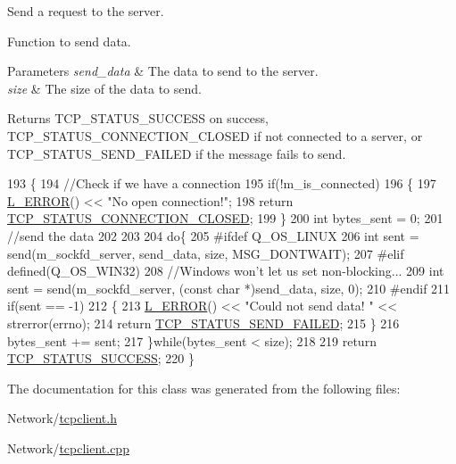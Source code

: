 Send a request to the server. 

Function to send data.


\begin{DoxyParams}{Parameters}
{\em send\-\_\-data} & The data to send to the server. \\
\hline
{\em size} & The size of the data to send. \\
\hline
\end{DoxyParams}
\begin{DoxyReturn}{Returns}
T\-C\-P\-\_\-\-S\-T\-A\-T\-U\-S\-\_\-\-S\-U\-C\-C\-E\-S\-S on success, T\-C\-P\-\_\-\-S\-T\-A\-T\-U\-S\-\_\-\-C\-O\-N\-N\-E\-C\-T\-I\-O\-N\-\_\-\-C\-L\-O\-S\-E\-D if not connected to a server, or T\-C\-P\-\_\-\-S\-T\-A\-T\-U\-S\-\_\-\-S\-E\-N\-D\-\_\-\-F\-A\-I\-L\-E\-D if the message fails to send. 
\end{DoxyReturn}

\begin{DoxyCode}
193 \{
194     \textcolor{comment}{//Check if we have a connection}
195     \textcolor{keywordflow}{if}(!m\_is\_connected)
196     \{
197         \hyperlink{Log_8h_a1a242c34c5066fb0c62d909f22d3716d}{L\_ERROR}() << \textcolor{stringliteral}{"No open connection!"};
198         \textcolor{keywordflow}{return} \hyperlink{tcpclient_8h_ab36b81f0daebbad95a533ea9951ee569a31579e5845f194f359afdb50b2f85a86}{TCP\_STATUS\_CONNECTION\_CLOSED};
199     \}
200     \textcolor{keywordtype}{int} bytes\_sent = 0;
201     \textcolor{comment}{//send the data}
202 
203 
204     \textcolor{keywordflow}{do}\{
205 \textcolor{preprocessor}{#ifdef Q\_OS\_LINUX}
206 \textcolor{preprocessor}{}        \textcolor{keywordtype}{int} sent = send(m\_sockfd\_server, send\_data, size, MSG\_DONTWAIT);
207 \textcolor{preprocessor}{#elif defined(Q\_OS\_WIN32)}
208 \textcolor{preprocessor}{}        \textcolor{comment}{//Windows won't let us set non-blocking...}
209         \textcolor{keywordtype}{int} sent = send(m\_sockfd\_server, (\textcolor{keyword}{const} \textcolor{keywordtype}{char} *)send\_data, size, 0);
210 \textcolor{preprocessor}{#endif}
211 \textcolor{preprocessor}{}        \textcolor{keywordflow}{if}(sent == -1)
212         \{
213             \hyperlink{Log_8h_a1a242c34c5066fb0c62d909f22d3716d}{L\_ERROR}() << \textcolor{stringliteral}{"Could not send data! "} << strerror(errno);
214             \textcolor{keywordflow}{return} \hyperlink{tcpclient_8h_ab36b81f0daebbad95a533ea9951ee569a0fbe81dbe6a6972d6c80cecad3ee0d73}{TCP\_STATUS\_SEND\_FAILED};
215         \}
216         bytes\_sent += sent;
217     \}\textcolor{keywordflow}{while}(bytes\_sent < size);
218 
219     \textcolor{keywordflow}{return} \hyperlink{tcpclient_8h_ab36b81f0daebbad95a533ea9951ee569a12de2815c3e64df634ac4d26a0bb2007}{TCP\_STATUS\_SUCCESS};
220 \}
\end{DoxyCode}


The documentation for this class was generated from the following files\-:\begin{DoxyCompactItemize}
\item 
Network/\hyperlink{tcpclient_8h}{tcpclient.\-h}\item 
Network/\hyperlink{tcpclient_8cpp}{tcpclient.\-cpp}\end{DoxyCompactItemize}
